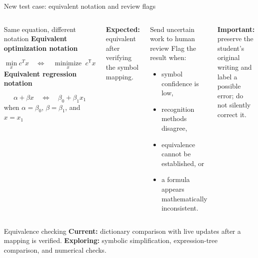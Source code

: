 \documentclass[aspectratio=169,10pt]{beamer}
\newcommand{\good}[1]{\textcolor{Forest}{\textbf{#1}}}
\newcommand{\risk}[1]{\textcolor{Rust}{\textbf{#1}}}
\begin{document}
\begin{frame}[shrink=8]{New test case: equivalent notation and review flags}
\begin{columns}[T,onlytextwidth]
\begin{block}{Same equation, different notation}
\centering
\textbf{Equivalent optimization notation}\par
\[\min_x c^T x
  \quad\Longleftrightarrow\quad
  \operatorname*{minimize}_{x}\;c^{\mathsf T}x\]
\textbf{Equivalent regression notation}\par
\[\alpha+\beta x
  \quad\Longleftrightarrow\quad
  \beta_0+\beta_1x_1\]
\scriptsize when $\alpha=\beta_0$, $\beta=\beta_1$, and $x=x_1$
\end{block}
\good{Expected:} equivalent after verifying the symbol mapping.
\begin{block}{Send uncertain work to human review}
Flag the result when:
\begin{itemize}
\item symbol confidence is low,
\item recognition methods disagree,
\item equivalence cannot be established, or
\item a formula appears mathematically inconsistent.
\end{itemize}
\end{block}
\risk{Important:} preserve the student's original writing and label a possible error; do not silently correct it.
\end{columns}
\vspace{.35em}
\begin{block}{Equivalence checking}
\scriptsize
\textbf{Current:} dictionary comparison with live updates after a mapping is verified. \quad
\textbf{Exploring:} symbolic simplification, expression-tree comparison, and numerical checks.
\end{block}
\end{frame}
\end{document}
